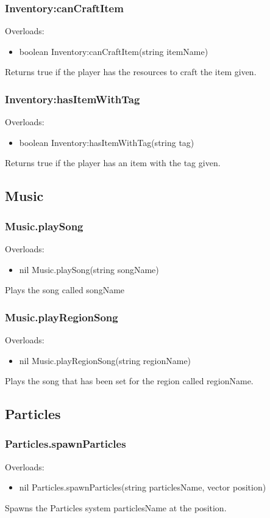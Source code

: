 \documentclass{book}
\newenvironment{ulist}
	{\begin{itemize}
			\itemsep0em}
	{\end{itemize}}
\begin{document}
\subsubsection{Inventory:canCraftItem}
Overloads:
\begin{ulist}
	\item boolean Inventory:canCraftItem(string itemName)
\end{ulist}
Returns true if the player has the resources to craft the item given.

\subsubsection{Inventory:hasItemWithTag}
Overloads:
\begin{ulist}
	\item boolean Inventory:hasItemWithTag(string tag)
\end{ulist}
Returns true if the player has an item with the tag given.

\subsection{Music}
\subsubsection{Music.playSong}
Overloads:
\begin{ulist}
	\item nil Music.playSong(string songName)
\end{ulist}
Plays the song called songName

\subsubsection{Music.playRegionSong}
Overloads:
\begin{ulist}
	\item nil Music.playRegionSong(string regionName)
\end{ulist}
Plays the song that has been set for the region called regionName.


\subsection{Particles}
\subsubsection{Particles.spawnParticles}
Overloads:
\begin{ulist}
	\item nil Particles.spawnParticles(string particlesName, vector position)
\end{ulist}
Spawns the Particles system particlesName at the position.
\end{document}
